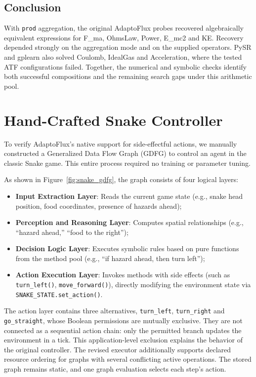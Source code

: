 \subsection{Conclusion}

With \texttt{prod} aggregation, the original AdaptoFlux probes recovered algebraically equivalent expressions for F\_ma, OhmsLaw, Power, E\_mc2 and KE. Recovery depended strongly on the aggregation mode and on the supplied operators. PySR and gplearn also solved Coulomb, IdealGas and Acceleration, where the tested ATF configurations failed. Together, the numerical and symbolic checks identify both successful compositions and the remaining search gaps under this arithmetic pool.

\section{Hand-Crafted Snake Controller}
\label{app:snake_controller}

To verify AdaptoFlux's native support for side-effectful actions, we manually constructed a Generalized Data Flow Graph (GDFG) to control an agent in the classic Snake game. This entire process required no training or parameter tuning.

As shown in Figure~\ref{fig:snake_gdfg}, the graph consists of four logical layers:
\begin{itemize}
    \item \textbf{Input Extraction Layer}: Reads the current game state (e.g., snake head position, food coordinates, presence of hazards ahead);
    \item \textbf{Perception and Reasoning Layer}: Computes spatial relationships (e.g., ``hazard ahead,'' ``food to the right'');
    \item \textbf{Decision Logic Layer}: Executes symbolic rules based on pure functions from the method pool (e.g., ``if hazard ahead, then turn left'');
    \item \textbf{Action Execution Layer}: Invokes methods with side effects (such as \texttt{turn\_left()}, \texttt{move\_forward()}), directly modifying the environment state via \texttt{SNAKE\_STATE.set\_action()}.
\end{itemize}

The action layer contains three alternatives, \texttt{turn\_left}, \texttt{turn\_right} and \texttt{go\_straight}, whose Boolean permissions are mutually exclusive. They are not connected as a sequential action chain: only the permitted branch updates the environment in a tick. This application-level exclusion explains the behavior of the original controller. The revised executor additionally supports declared resource ordering for graphs with several conflicting active operations. The stored graph remains static, and one graph evaluation selects each step's action.

